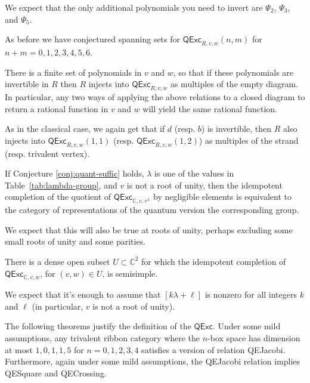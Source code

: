 \documentclass[12pt]{amsart}
\begin{document}
We expect that the only additional polynomials you need to invert are $\Psi_2$, $\Psi_3$, and $\Psi_5$.

As before we have conjectured spanning sets for $\mathsf{QExc}_{R,v,w}(n,m)$
for $n+m=0,1,2,3,4,5,6$.

\begin{conjecture}
  \label{conj:quant-consist}
There is a finite set of polynomials in $v$ and $w$, so that if these
polynomials are invertible in $R$ then $R$ injects into
$\mathsf{QExc}_{R,v,w}$ as multiples of the empty diagram.  In particular, any
two ways of applying the above relations to a closed diagram to return a
rational function in $v$ and $w$ will yield the same rational function.
\end{conjecture}

As in the classical case, we again get that if $d$ (resp. $b$) is invertible,
then $R$ also injects into $\mathsf{QExc}_{R,v,w}(1,1)$ (resp.
$\mathsf{QExc}_{R,v,w}(1,2)$) as multiples of the strand (resp. trivalent
vertex).

\begin{proposition}\label{prop:quant-spec}
  If Conjecture \ref{conj:quant-suffic} holds, $\lambda$ is one of
  the values in Table~\ref{tab:lambda-group},
  and $v$ is not a root of unity, then the idempotent completion of
  the quotient of
$\mathsf{QExc}_{\mathbb{C},v,v^\lambda}$ by negligible elements is
equivalent to the category of representations of the quantum version
the corresponding group.
\end{proposition}

We expect that this will also be true at roots of unity, perhaps excluding some small roots of unity and some parities.


\begin{conjecture}
There is a dense open subset $U \subset \mathbb{C}^2$ for which the idempotent
completion of $\mathsf{QExc}_{\mathbb{C},v,w}$, for $(v,w) \in U$, is
semisimple.
\end{conjecture}

We expect that it's enough to assume that $[k \lambda + \ell]$ is nonzero for all integers $k$ and $\ell$ (in particular, $v$ is not a root of unity).

The following theorems justify the definition of the $\mathsf{QExc}$.  Under
some mild assumptions, any trivalent ribbon category where the $n$-box space
has dimension at most $1,0,1,1,5$ for $n=0,1,2,3,4$ satisfies a version of
relation QEJacobi.  Furthermore, again under some mild assumptions, the
QEJacobi relation implies QESquare and QECrossing.
\end{document}
